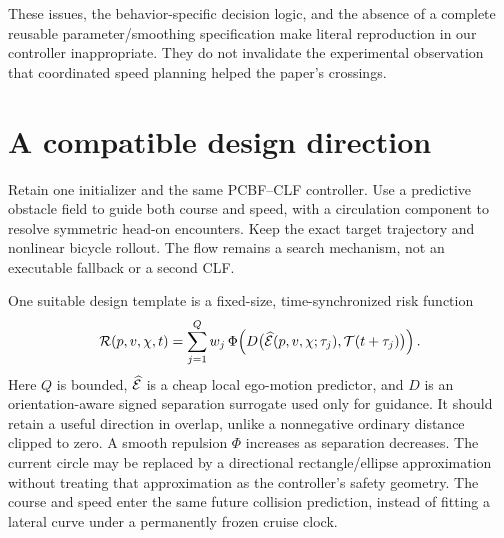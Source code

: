 \documentclass[10pt]{article}
\begin{document}
These issues, the behavior-specific decision logic, and the absence of a
complete reusable parameter/smoothing specification make literal reproduction
in our controller inappropriate. They do not invalidate the experimental
observation that coordinated speed planning helped the paper's crossings.

\section{A compatible design direction}
Retain one initializer and the same PCBF--CLF controller. Use a predictive
obstacle field to guide both course and speed, with a circulation component
to resolve symmetric head-on encounters. Keep the exact target trajectory
and nonlinear bicycle rollout. The flow remains a search mechanism, not an
executable fallback or a second CLF.

One suitable design template is a fixed-size, time-synchronized risk function
\[
 {\cal R}(p,v,\chi,t)
   =\sum_{j=1}^{Q}w_j\,
     \Phi\!\left(D\big(\widehat{\cal E}(p,v,\chi;\tau_j),
                                {\cal T}(t+\tau_j)\big)\right).
\]
Here $Q$ is bounded, $\widehat{\cal E}$ is a cheap local ego-motion predictor,
and $D$ is an orientation-aware signed separation surrogate used only for
guidance. It should retain a useful direction in overlap, unlike a
nonnegative ordinary distance clipped to zero. A smooth repulsion
$\Phi$ increases as separation decreases. The current circle may be
replaced by a directional rectangle/ellipse approximation without treating
that approximation as the controller's safety geometry.
The course and speed enter the same future collision prediction, instead of
fitting a lateral curve under a permanently frozen cruise clock.
\end{document}
